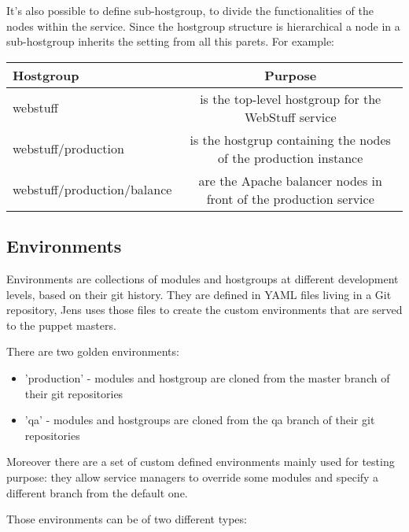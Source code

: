 It's also possible to define sub-hostgroup, to divide the functionalities
of the nodes within the service. Since the hostgroup structure is
hierarchical a node in a sub-hostgroup inherits the setting from all this
parets. For example: 

\begin{table}[H]
    \begin{center}
    \begin{tabular}{|l|c|}
        \hline
        \textbf{Hostgroup} & \textbf{Purpose} \\
        \hline
        webstuff & is the top-level hostgroup for the WebStuff service \\
        \hline
        webstuff/production & is the hostgrup containing the nodes of the production instance \\
        \hline
        webstuff/production/balance & are the Apache balancer nodes in front of the production service \\
        \hline
    \end{tabular}
    \end{center}
\end{table}

\subsection{Environments}

Environments are collections of modules and hostgroups at different
development levels, based on their git history. They are defined in YAML
files living in a Git repository, Jens uses those files to create the
custom environments that are served to the puppet masters.

There are two golden environments:

\begin{itemize}
    \item 'production' - modules and hostgroup are cloned from the master branch of
their git repositories
    \item 'qa' - modules and hostgroups are cloned from the qa branch of their git
repositories
\end{itemize}

Moreover there are a set of custom defined environments mainly used for
testing purpose: they allow service managers to override some modules and
specify a different branch from the default one.

Those environments can be of two different types:

